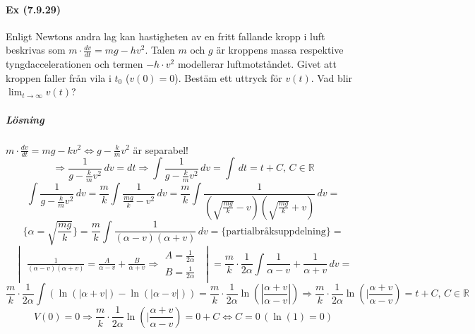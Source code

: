 \paragraph*{Ex (7.9.29)} Enligt Newtons andra lag kan hastigheten av en fritt fallande kropp i luft beskrivas som $m\cdot\frac{dv}{dt}=mg-hv^2$.
Talen $m$ och $g$ är kroppens massa respektive tyngdaccelerationen och termen $-h\cdot v^2$ modellerar luftmotståndet.
Givet att kroppen faller från vila i $t_0$ ($v(0)=0$).
Bestäm ett uttryck för $v(t)$.
Vad blir $\lim_{t\to\infty}v(t)$?
\subparagraph{Lösning}
$m\cdot\frac{dv}{dt}=mg-kv^2\Leftrightarrow g-\frac{k}{m}v^2$ är separabel!
\begin{equation*}
    \Rightarrow \frac{1}{g-\frac{k}{m}v^2}\, dv=dt\Rightarrow
    \int\frac{1}{g-\frac{k}{m}v^2}\, dv=
    \int\, dt=
    t+C,\, C\in\mathbb{R}
\end{equation*}
\begin{equation*}
    \int\frac{1}{g-\frac{k}{m}v^2}\, dv=
    \frac{m}{k}\int\frac{1}{\frac{mg}{k}-v^2}\, dv=
    \frac{m}{k}\int\frac{1}{(\sqrt{\frac{mg}{k}}-v)(\sqrt{\frac{mg}{k}}+v)}\, dv=
\end{equation*}
\begin{equation*}
    \{\alpha=\sqrt{\frac{mg}{k}}\}=
    \frac{m}{k}\int\frac{1}{(\alpha-v)(\alpha+v)}\, dv=
    \{\text{partialbråksuppdelning}\}=
\end{equation*}
\begin{equation*}
    \begin{vmatrix}
        \frac{1}{(\alpha-v)(\alpha+v)}=\frac{A}{\alpha-v}+\frac{B}{\alpha+v}\Rightarrow
        \begin{matrix}
            A=\frac{1}{2\alpha} \\
            B=\frac{1}{2\alpha}
        \end{matrix}
    \end{vmatrix}=
    \frac{m}{k}\cdot\frac{1}{2\alpha}\int\frac{1}{\alpha-v}+\frac{1}{\alpha+v}\, dv=
\end{equation*}
\begin{equation*}
    \frac{m}{k}\cdot\frac{1}{2\alpha}\int(\ln(|\alpha+v|)-\ln(|\alpha-v|))=
    \frac{m}{k}\cdot\frac{1}{2\alpha}\ln(|\frac{\alpha+v}{\alpha-v}|)\Rightarrow
    \frac{m}{k}\cdot\frac{1}{2\alpha}\ln(|\frac{\alpha+v}{\alpha-v})=t+C,\, C\in\mathbb{R}
\end{equation*}
\begin{equation*}
    V(0)=0\Rightarrow
    \frac{m}{k}\cdot\frac{1}{2\alpha}\ln(|\frac{\alpha+v}{\alpha-v})=
    0+C\Leftrightarrow
    C=0\, (\ln(1)=0)
\end{equation*}
